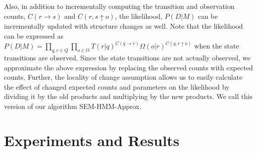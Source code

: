 \documentclass[letterpaper]{article}
\begin{document}


Also, in addition to incrementally computing the transition and observation counts, $C(r \rightarrow s)$ and $C(r,s \uparrow o)$, the likelihood, $P(D|M)$ can be incrementally updated with structure changes as well. Note that the likelihood can be expressed as $P(D|M) = \prod_{q, r \in Q} \prod_{o \in O} T(r|q)^{C(q \rightarrow r)} \Omega(o|r)^{C(q,r \uparrow o)}$ when the state transitions are observed. Since the state transitions are not actually observed, we approximate the above expression by replacing the observed counts with expected counts. Further, the locality of change assumption allows us to easily
calculate the effect of changed expected counts and parameters on the likelihood by dividing it by the old products and multiplying by the new products. We call this version of our algorithm SEM-HMM-Approx.

\section{Experiments and Results}
\end{document}
